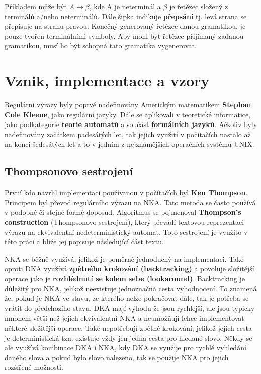 Příkladem může být $A \longrightarrow \beta$, kde A je neterminál a $\beta$ je řetězec složený z terminálů a/nebo neterminálů. 
Dále šipka indikuje \textbf{přepsání} tj. levá strana se přepisuje na stranu pravou.
Konečný generovaný řetězec danou gramatikou, je pouze tvořen terminálními symboly.
Aby mohl být řetězec přijímaný zadanou gramatikou, musí ho být schopná tato gramatika vygenerovat.

\section{Vznik, implementace a vzory}
Regulární výrazy byly poprvé nadefinovány Americkým matematikem \textbf{Stephan Cole Kleene}, jako regulární jazyky. 
Dále se aplikovali v teoretické informatice, jako podkategorie \textbf{teorie automatů} a součást \textbf{formálních jazyků}.
Ačkoliv byly nadefinovány začátkem padesátých let, tak jejich využití v počítačích nastalo až na konci šedesátých let a to v 
jedním z nejznámějších operačních systémů UNIX.

\subsection*{Thompsonovo sestrojení}

První kdo navrhl implementaci používanou v počítačích byl \textbf{Ken Thompson}.
Principem byl převod regulárního výrazu na NKA.
Tato metoda se často používá v podobné či stejné formě doposud.
Algoritmus se pojmenoval \textbf{Thompson's construction} (Thompsonovo sestrojení), který převádí textovou reprezentaci výrazu na ekvivalentní nedeterministický automat.
Toto sestrojení je využito v této práci a blíže jej popisuje následující část textu.

NKA se běžně využívá, jelikož je poměrně jednoduchý na implementaci.
Také oproti DKA využívá \textbf{zpětného krokování (backtracking)} a povoluje složitější operace jako je \textbf{rozhlédnutí se kolem sebe (lookaround)}.
Backtracking je důležitý pro NKA, jelikož neexistuje jednoznačná cesta vyhodnocení.
To znamená že, pokud je NKA ve stavu, ze kterého nelze pokračovat dále, tak je potřeba se vrátit do předchozího stavu.
DKA mají výhodu že jsou rychlejší, ale jsou typicky mnohem větší než jejich ekvivalentní NKA a neumožňují lehce implementovat některé složitější operace.
Také nepotřebují zpětné krokování, jelikož jejich cesta je deterministická tzn. existuje vždy jen jedna cesta pro hledané slovo.
Někdy se ale využívá kombinace DKA i NKA, kdy DKA se využije pro rychlé vyhledání daného slova a pokud bylo slovo nalezeno, 
tak se použije NKA pro jejich rozšířené možnosti.

